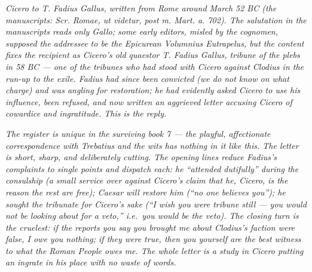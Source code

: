 
\textit{Cicero to T. Fadius Gallus, written from Rome
around March 52 BC (the manuscripts: \textit{Scr. Romae,
ut videtur, post m. Mart. a. 702}). The salutation in the
manuscripts reads only \textit{Gallo}; some early editors,
misled by the cognomen, supposed the addressee to be the
Epicurean Volumnius Eutrapelus, but the content fixes the
recipient as Cicero's old quaestor T. Fadius Gallus,
tribune of the plebs in 58 BC --- one of the tribunes who
had stood with Cicero against Clodius in the run-up to
the exile. Fadius had since been convicted (we do not
know on what charge) and was angling for restoration; he
had evidently asked Cicero to use his influence, been
refused, and now written an aggrieved letter accusing
Cicero of cowardice and ingratitude. This is the
reply.}

\textit{The register is unique in the surviving book 7
--- the playful, affectionate correspondence with
Trebatius and the wits has nothing in it like this. The
letter is short, sharp, and deliberately cutting. The
opening lines reduce Fadius's complaints to single
points and dispatch each: he ``attended dutifully''
during the consulship (a small service over against
Cicero's claim that he, Cicero, is the reason the rest
are \textit{free}); Caesar will restore him (``no one
believes you''); he sought the tribunate for Cicero's
sake (``I wish you were tribune still --- you would not
be looking about for a veto,'' i.e.\ you would be the
veto). The closing turn is the cruelest: if the reports
you say you brought me about Clodius's faction were
false, I owe you nothing; if they were true, then you
yourself are the best witness to what the Roman People
owes me. The whole letter is a study in Cicero putting
an ingrate in his place with no waste of words.}
